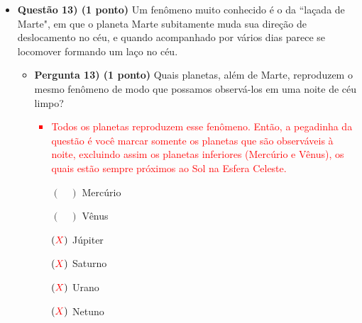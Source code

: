 \documentclass[a4paper, 12pt]{article}
\newcommand{\red}[1]{\textcolor{red}{#1}}
\begin{document}
\begin{flushleft}
\begin{itemize}
            \item \textbf{Questão 13) (1 ponto)} Um fenômeno muito conhecido é o da ``laçada de Marte", em que o planeta Marte subitamente muda sua direção de deslocamento no céu, e quando acompanhado por vários dias parece se locomover formando um laço no céu.
                \begin{itemize}
                    \item \textbf{Pergunta 13) (1 ponto)} Quais planetas, além de Marte, reproduzem o mesmo fenômeno de modo que possamos observá-los em uma noite de céu limpo?
                        \red{\begin{itemize}
                            \item Todos os planetas reproduzem esse fenômeno. Então, a pegadinha da questão é você marcar somente os planetas que são observáveis à noite, excluindo assim os planetas inferiores (Mercúrio e Vênus), os quais estão sempre próximos ao Sol na Esfera Celeste.
                        \end{itemize}}
                        \begin{itemize}
                            \item[$(\quad)$] Mercúrio
                            \item[$(\quad)$] Vênus
                            \item[$(\red{X})$] Júpiter
                            \item[$(\red{X})$] Saturno
                            \item[$(\red{X})$] Urano
                            \item[$(\red{X})$] Netuno
                        \end{itemize}
                \end{itemize}


\end{itemize}
\end{flushleft}
\end{document}
